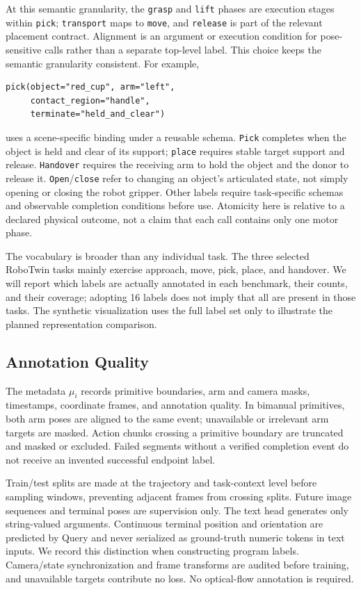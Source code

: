 At this semantic granularity, the \texttt{grasp} and \texttt{lift} phases are execution stages within \texttt{pick}; \texttt{transport} maps to \texttt{move}, and \texttt{release} is part of the relevant placement contract. Alignment is an argument or execution condition for pose-sensitive calls rather than a separate top-level label. This choice keeps the semantic granularity consistent. For example,
\begin{minipage}{\columnwidth}
\begin{lstlisting}
pick(object="red_cup", arm="left",
     contact_region="handle",
     terminate="held_and_clear")
\end{lstlisting}
\end{minipage}
uses a scene-specific binding under a reusable schema. \texttt{Pick} completes when the object is held and clear of its support; \texttt{place} requires stable target support and release. \texttt{Handover} requires the receiving arm to hold the object and the donor to release it. \texttt{Open}/\texttt{close} refer to changing an object's articulated state, not simply opening or closing the robot gripper. Other labels require task-specific schemas and observable completion conditions before use. Atomicity here is relative to a declared physical outcome, not a claim that each call contains only one motor phase.

The vocabulary is broader than any individual task. The three selected RoboTwin tasks mainly exercise approach, move, pick, place, and handover. We will report which labels are actually annotated in each benchmark, their counts, and their coverage; adopting 16 labels does not imply that all are present in those tasks. The synthetic visualization uses the full label set only to illustrate the planned representation comparison.
\subsection{Annotation Quality}
\label{app:annotation}
The metadata $\mu_i$ records primitive boundaries, arm and camera masks, timestamps, coordinate frames, and annotation quality. In bimanual primitives, both arm poses are aligned to the same event; unavailable or irrelevant arm targets are masked. Action chunks crossing a primitive boundary are truncated and masked or excluded. Failed segments without a verified completion event do not receive an invented successful endpoint label.

Train/test splits are made at the trajectory and task-context level before sampling windows, preventing adjacent frames from crossing splits. Future image sequences and terminal poses are supervision only. The text head generates only string-valued arguments. Continuous terminal position and orientation are predicted by Query and never serialized as ground-truth numeric tokens in text inputs. We record this distinction when constructing program labels. Camera/state synchronization and frame transforms are audited before training, and unavailable targets contribute no loss. No optical-flow annotation is required.
